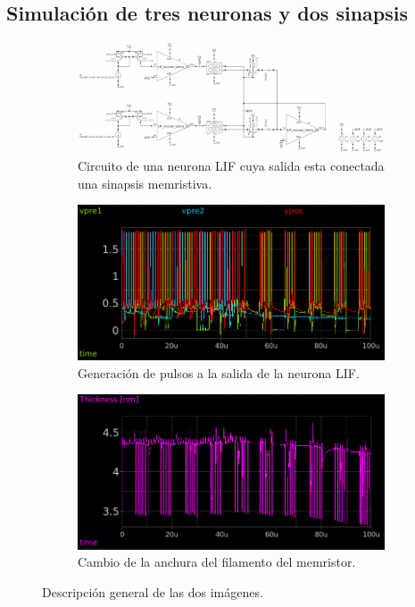 \documentclass[conference]{IEEEtran}
\begin{document}
\subsection{Simulación de tres neuronas y dos sinapsis}
\begin{figure}[htbp]
    \centering
    \begin{subfigure}[b]{0.45\textwidth}
        \centering
        \includegraphics[width=\textwidth]{img/3LIF.png}
        \caption{Circuito de una neurona LIF cuya salida esta conectada una sinapsis memristiva.}
        \label{fig:3LIF}
    \end{subfigure}
    \hfill
    \begin{subfigure}[b]{0.45\textwidth}
        \centering
        \includegraphics[width=\textwidth]{img/3LIF_V.png}
        \caption{Generación de pulsos a la salida de la neurona LIF.}
        \label{fig:3LIF_V}
    \end{subfigure}
    \hfill
    \begin{subfigure}[b]{0.45\textwidth}
        \centering
        \includegraphics[width=\textwidth]{img/3LIF_T.png}
        \caption{Cambio de la anchura del filamento del memristor.}
        \label{fig:3LIF_T}
    \end{subfigure}
    \caption{Descripción general de las dos imágenes.}
    \label{fig:LIF3}
\end{figure}
\end{document}
